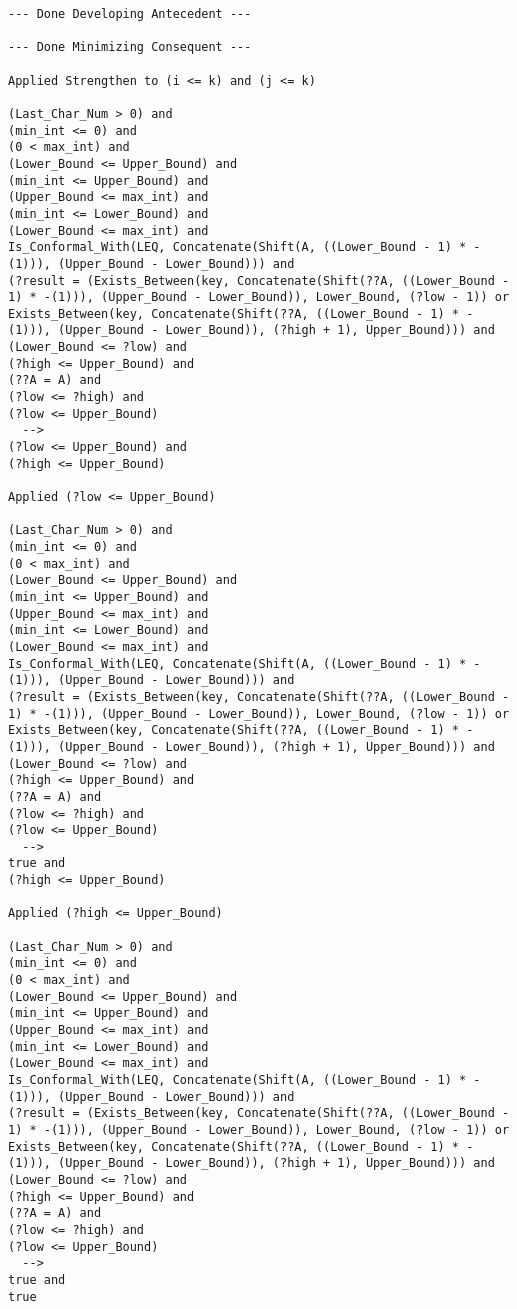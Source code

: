 \begin{lstlisting}[language=resolve]
--- Done Developing Antecedent ---

--- Done Minimizing Consequent ---

Applied Strengthen to (i <= k) and (j <= k)

(Last_Char_Num > 0) and
(min_int <= 0) and
(0 < max_int) and
(Lower_Bound <= Upper_Bound) and
(min_int <= Upper_Bound) and
(Upper_Bound <= max_int) and
(min_int <= Lower_Bound) and
(Lower_Bound <= max_int) and
Is_Conformal_With(LEQ, Concatenate(Shift(A, ((Lower_Bound - 1) * -(1))), (Upper_Bound - Lower_Bound))) and
(?result = (Exists_Between(key, Concatenate(Shift(??A, ((Lower_Bound - 1) * -(1))), (Upper_Bound - Lower_Bound)), Lower_Bound, (?low - 1)) or Exists_Between(key, Concatenate(Shift(??A, ((Lower_Bound - 1) * -(1))), (Upper_Bound - Lower_Bound)), (?high + 1), Upper_Bound))) and
(Lower_Bound <= ?low) and
(?high <= Upper_Bound) and
(??A = A) and
(?low <= ?high) and
(?low <= Upper_Bound)
  -->
(?low <= Upper_Bound) and
(?high <= Upper_Bound)

Applied (?low <= Upper_Bound)

(Last_Char_Num > 0) and
(min_int <= 0) and
(0 < max_int) and
(Lower_Bound <= Upper_Bound) and
(min_int <= Upper_Bound) and
(Upper_Bound <= max_int) and
(min_int <= Lower_Bound) and
(Lower_Bound <= max_int) and
Is_Conformal_With(LEQ, Concatenate(Shift(A, ((Lower_Bound - 1) * -(1))), (Upper_Bound - Lower_Bound))) and
(?result = (Exists_Between(key, Concatenate(Shift(??A, ((Lower_Bound - 1) * -(1))), (Upper_Bound - Lower_Bound)), Lower_Bound, (?low - 1)) or Exists_Between(key, Concatenate(Shift(??A, ((Lower_Bound - 1) * -(1))), (Upper_Bound - Lower_Bound)), (?high + 1), Upper_Bound))) and
(Lower_Bound <= ?low) and
(?high <= Upper_Bound) and
(??A = A) and
(?low <= ?high) and
(?low <= Upper_Bound)
  -->
true and
(?high <= Upper_Bound)

Applied (?high <= Upper_Bound)

(Last_Char_Num > 0) and
(min_int <= 0) and
(0 < max_int) and
(Lower_Bound <= Upper_Bound) and
(min_int <= Upper_Bound) and
(Upper_Bound <= max_int) and
(min_int <= Lower_Bound) and
(Lower_Bound <= max_int) and
Is_Conformal_With(LEQ, Concatenate(Shift(A, ((Lower_Bound - 1) * -(1))), (Upper_Bound - Lower_Bound))) and
(?result = (Exists_Between(key, Concatenate(Shift(??A, ((Lower_Bound - 1) * -(1))), (Upper_Bound - Lower_Bound)), Lower_Bound, (?low - 1)) or Exists_Between(key, Concatenate(Shift(??A, ((Lower_Bound - 1) * -(1))), (Upper_Bound - Lower_Bound)), (?high + 1), Upper_Bound))) and
(Lower_Bound <= ?low) and
(?high <= Upper_Bound) and
(??A = A) and
(?low <= ?high) and
(?low <= Upper_Bound)
  -->
true and
true


\end{lstlisting}
